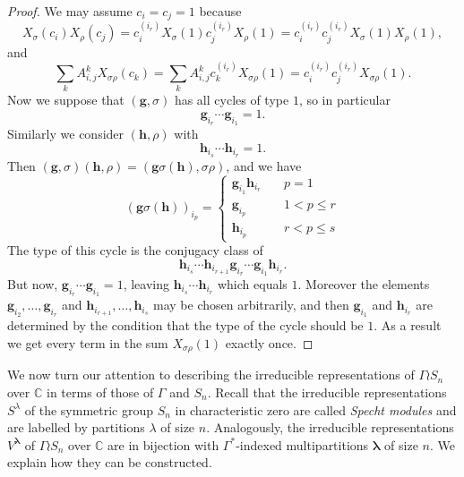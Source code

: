 \documentclass[10pt]{article}
\theoremstyle{definition}
\newcommand{\bs}{\boldsymbol}
\begin{document}
\begin{proof}
We may assume $c_i = c_j = 1$ because
\[
X_\sigma(c_i) X_\rho(c_j) = c_i^{(i_r)} X_{\sigma}(1) c_j^{(i_r)} X_{\rho} (1) = c_i^{(i_r)}c_j^{(i_r)} X_\sigma(1) X_\rho(1),
\]
and
\[
\sum_{k} A_{i,j}^k X_{\sigma\rho}(c_k) = \sum_{k} A_{i,j}^k c_k^{(i_r)} X_{\sigma\rho}(1) = c_i^{(i_r)}c_j^{(i_r)} X_{\sigma\rho}(1).
\]
Now we suppose that $(\mathbf{g}, \sigma)$ has all cycles of type $1$, so in particular
\[
\mathbf{g}_{i_r} \cdots \mathbf{g}_{i_1} = 1.
\]
Similarly we consider $(\mathbf{h}, \rho)$ with
\[
\mathbf{h}_{i_s} \cdots \mathbf{h}_{i_r} = 1.
\]
Then $(\mathbf{g}, \sigma)(\mathbf{h}, \rho) = (\mathbf{g} \sigma(\mathbf{h}), \sigma\rho)$, and we have 
\[
(\mathbf{g} \sigma(\mathbf{h}))_{i_p} =
 \left\{
        \begin{array}{ll}
            \mathbf{g}_{i_1} \mathbf{h}_{i_r} & \quad p=1 \\
            \mathbf{g}_{i_p} & \quad 1 < p \leq r \\
            \mathbf{h}_{i_p} & \quad r < p \leq s
        \end{array}
    \right.
\]
The type of this cycle is the conjugacy class of
\[
\mathbf{h}_{i_s} \cdots \mathbf{h}_{i_{r+1}} \mathbf{g}_{i_r} \cdots \mathbf{g}_{i_1}\mathbf{h}_{i_r}.
\]
But now, $\mathbf{g}_{i_r} \cdots \mathbf{g}_{i_1} = 1$, leaving $\mathbf{h}_{i_s} \cdots \mathbf{h}_{i_r}$ which equals $1$. Moreover the elements $\mathbf{g}_{i_2}, \ldots, \mathbf{g}_{i_r}$ and $\mathbf{h}_{i_{r+1}}, \ldots, \mathbf{h}_{i_s}$ may be chosen arbitrarily, and then $\mathbf{g}_{i_1}$ and $\mathbf{h}_{i_r}$ are determined by the condition that the type of the cycle should be $1$. As a result we get every term in the sum $X_{\sigma\rho}(1)$ exactly once.
\end{proof}


We now turn our attention to describing the irreducible representations of $\Gamma \wr S_n$ over $\mathbb{C}$ in terms of those of $\Gamma$ and $S_n$. Recall that the irreducible representations $S^\lambda$ of the symmetric group $S_n$ in characteristic zero are called \emph{Specht modules} and are labelled by partitions $\lambda$ of size $n$. Analogously, the irreducible representations $V^{\bs\lambda}$ of $\Gamma \wr S_n$ over $\mathbb{C}$ are in bijection with $\Gamma^*$-indexed multipartitions $\bs\lambda$ of size $n$. We explain how they can be constructed.
\end{document}
